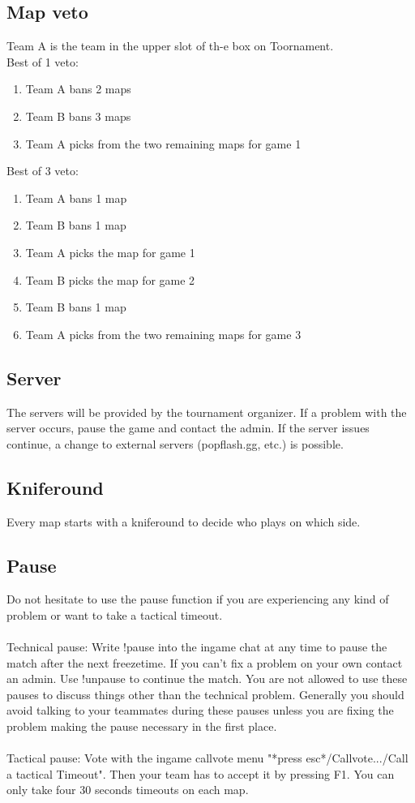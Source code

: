 \documentclass{article}
\begin{document}
\subsection{Map veto}
Team A is the team in the upper slot of th-e box on Toornament.\\
Best of 1 veto:
\begin{enumerate}
\item Team A bans 2 maps
\item Team B bans 3 maps
\item Team A picks from the two remaining maps for game 1
\end{enumerate}
Best of 3 veto:
\begin{enumerate}
\item Team A bans 1 map
\item Team B bans 1 map
\item Team A picks the map for game 1
\item Team B picks the map for game 2
\item Team B bans 1 map
\item Team A picks from the two remaining maps for game 3
\end{enumerate}



\subsection{Server}
The servers will be provided by the tournament organizer. If a problem with the server occurs, pause the game and contact the admin. If the server issues continue, a change to external servers (popflash.gg, etc.) is possible.

\subsection{Kniferound}
Every map starts with a kniferound to decide who plays on which side.

\subsection{Pause}
Do not hesitate to use the pause function if you are experiencing any kind of problem or want to take a tactical timeout. \\
\\Technical pause: Write {\selectfont 
!pause}  into the ingame chat at any time to pause the match after the next freezetime. If you can't fix a problem on your own contact an admin. Use {\selectfont 
!unpause} to continue the match. You are not allowed to use these pauses to discuss things other than the technical problem. Generally you should avoid talking to your teammates during these pauses unless you are fixing the problem making the pause necessary in the first place.\\
\\Tactical pause: Vote with the ingame callvote menu "*press esc*/Callvote.../Call a tactical Timeout". Then your team has to accept it by pressing F1. You can only take four 30 seconds timeouts on each map.
\end{document}

